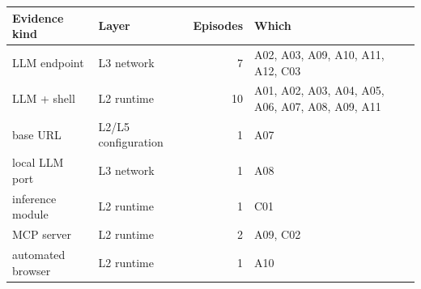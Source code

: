 \begin{tabular}{@{}l l r >{\raggedright\arraybackslash}p{5.4cm}@{}}
\toprule
Evidence kind & Layer & Episodes & Which \\
\midrule
LLM endpoint & L3 network & 7 & A02, A03, A09, A10, A11, A12, C03 \\
LLM + shell & L2 runtime & 10 & A01, A02, A03, A04, A05, A06, A07, A08, A09, A11 \\
base URL & L2/L5 configuration & 1 & A07 \\
local LLM port & L3 network & 1 & A08 \\
inference module & L2 runtime & 1 & C01 \\
MCP server & L2 runtime & 2 & A09, C02 \\
automated browser & L2 runtime & 1 & A10 \\
\bottomrule
\end{tabular}
